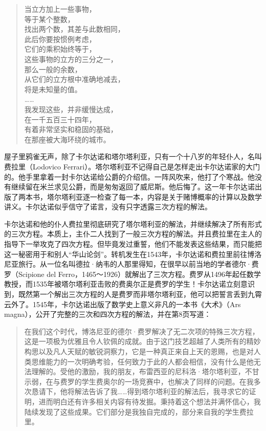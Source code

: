 \documentclass[b5paper]{ctexart}
\begin{document}
\begin{verse}
当立方加上一些事物，\\
等于某个整数，\\
找出两个数，其差与此数相同，\\
此后你要按惯例考虑，\\
它们的乘积始终等于，\\
这些事物的立方的三分之一，\\
那么一般的余数，\\
从它们的立方根中准确地减去，\\
将是未知量的值。\\
…… \\
我发现这些，并非缓慢达成，\\
在一千五百三十四年，\\
有着非常坚实和稳固的基础，\\
在那座被大海环绕的城市。
\end{verse}

屋子里鸦雀无声，除了卡尔达诺和塔尔塔利亚，只有一个十八岁的年轻仆人，名叫费拉里（Lodovico Ferrari）。塔尔塔利亚不记得自己是怎样走出卡尔达诺家的大门的。他手里拿着一封卡尔达诺给公爵的介绍信。一阵风吹来，他打了个寒战。他没有继续留在米兰求见公爵，而是匆匆返回了威尼斯。他后悔了。这一年卡尔达诺出版了两本书，塔尔塔利亚逐一检查了每一本，内容是关于赌博概率的计算以及数学讲义。卡尔达诺似乎信守了诺言，没有只字透露三次方程的解法。

卡尔达诺和他的仆人费拉里彻底研究了塔尔塔利亚的解法，并继续解决了所有形式的三次方程。本质上，主仆二人找到了一般三次方程的解法。并且费拉里在主人的指导下一举攻克了四次方程。但毕竟发过重誓，他们不能发表这些结果，而只能把这一秘密用于和别人“华山论剑”。转机发生在1543年，卡尔达诺和费拉里前往博洛尼亚旅行。从一位名叫德拉·纳韦的人那里得知，在很早以前当地的学者德尔·费罗（Scipione del Ferro，1465～1926）就解出了三次方程。费罗从1496年起任数学教授，而1535年被塔尔塔利亚击败的费奥尔正是费罗的学生！卡尔达诺立刻意识到，既然第一个解出三次方程的人是费罗而非塔尔塔利亚，他可以把誓言丢到九霄云外了。1545年，卡尔达诺出版了数学史上意义非凡的一本书《大术》（Ars magna），公开了完整的三次和四次方程的解法，并在第8页写道：

\begin{quotation}
在我们这个时代，博洛尼亚的德尔·费罗解决了无二次项的特殊三次方程，这是一项极为优雅且令人钦佩的成就。由于这门技艺超越了人类所有的精妙构思以及凡人天赋的敏锐洞察力，它是一种真正来自上天的恩赐，也是对人类思维能力的一次明确考验，任何致力于此的人都会相信，没有什么是他无法理解的。受他的激励，我的朋友，布雷西亚的尼科洛·塔尔塔利亚，不甘示弱，在与费罗的学生费奥尔的一场竞赛中，也解决了同样的问题。在我多次恳请下，他将解法告诉了我……得到塔尔塔利亚的解法后，我寻求它的证明，进而明白还有许多相关内容有待发掘。秉持着这个想法并满怀信心，我陆续发现了这些成果。它们部分是我独自完成的，部分来自我的学生费拉里。
\end{quotation}
\end{document}
